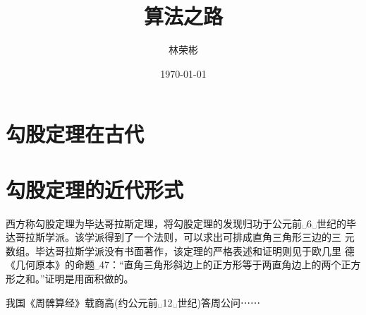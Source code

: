 \documentclass[UTF8]{ctexart}
\title{算法之路}
\author{林荣彬}
\date{\today}
\begin{document}
\maketitle
\tableofcontents
\section{勾股定理在古代}
\section{勾股定理的近代形式}


西方称勾股定理为毕达哥拉斯定理，将勾股定理的发现归功于公元前␣6␣世纪的毕达哥拉斯学派。该学派得到了一个法则，可以求出可排成直角三角形三边的三 元数组。毕达哥拉斯学派没有书面著作，该定理的严格表述和证明则见于欧几里 德《几何原本》的命题␣47：``直角三角形斜边上的正方形等于两直角边上的两个正方形之和。''证明是用面积做的。

我国《周髀算经》载商高(约公元前␣12␣世纪)答周公问⋯⋯
\end{document}
